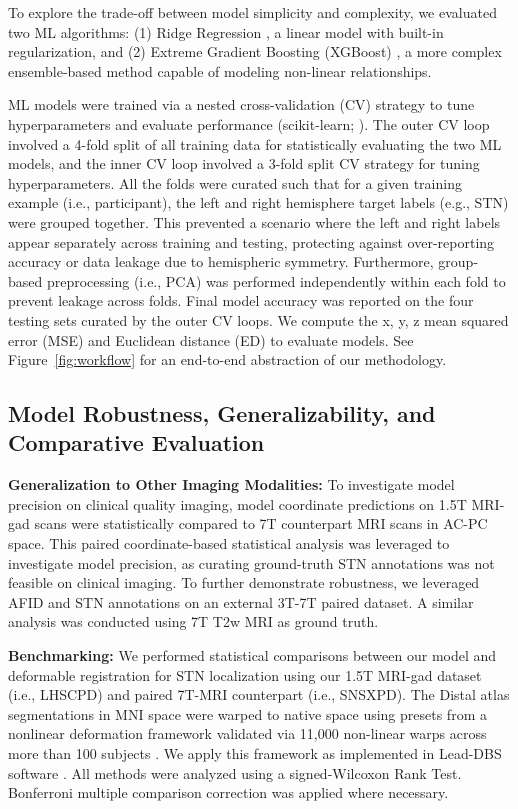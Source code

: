 To explore the trade-off between model simplicity and complexity, we evaluated two ML algorithms: (1) Ridge Regression \cite{ref}, a linear model with built-in regularization, and (2) Extreme Gradient Boosting (XGBoost) \cite{ref}, a more complex ensemble-based method capable of modeling non-linear relationships.

ML models were trained via a nested cross-validation (CV) strategy to tune hyperparameters and evaluate performance (scikit-learn; \cite{pedregosa2012}). The outer CV loop involved a 4-fold split of all training data for statistically evaluating the two ML models, and the inner CV loop involved a 3-fold split CV strategy for tuning hyperparameters. All the folds were curated such that for a given training example (i.e., participant), the left and right hemisphere target labels (e.g., STN) were grouped together. This prevented a scenario where the left and right labels appear separately across training and testing, protecting against over-reporting accuracy or data leakage due to hemispheric symmetry. Furthermore, group-based preprocessing (i.e., PCA) was performed independently within each fold to prevent leakage across folds. Final model accuracy was reported on the four testing sets curated by the outer CV loops. We compute the x, y, z mean squared error (MSE) and Euclidean distance (ED) to evaluate models. See Figure~\ref{fig:workflow} for an end-to-end abstraction of our methodology.

\subsection{Model Robustness, Generalizability, and Comparative Evaluation}

\textbf{Generalization to Other Imaging Modalities:} To investigate model precision on clinical quality imaging, model coordinate predictions on 1.5T MRI-gad scans were statistically compared to 7T counterpart MRI scans in AC-PC space. This paired coordinate-based statistical analysis was leveraged to investigate model precision, as curating ground-truth STN annotations was not feasible on clinical imaging. To further demonstrate robustness, we leveraged AFID and STN annotations on an external 3T-7T paired dataset. A similar analysis was conducted using 7T T2w MRI as ground truth.

\textbf{Benchmarking:} We performed statistical comparisons between our model and deformable registration for STN localization using our 1.5T MRI-gad dataset (i.e., LHSCPD) and paired 7T-MRI counterpart (i.e., SNSXPD). The Distal atlas segmentations in MNI space \cite{chakravarty2006, ewert2018} were warped to native space using presets from a nonlinear deformation framework validated via 11,000 non-linear warps across more than 100 subjects \cite{ewert2019}. We apply this framework as implemented in Lead-DBS software \cite{ref}. All methods were analyzed using a signed-Wilcoxon Rank Test. Bonferroni multiple comparison correction was applied where necessary.

